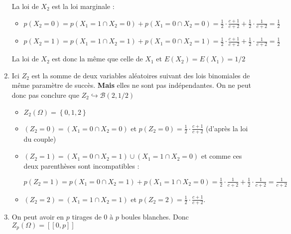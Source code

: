 \documentclass[a4paper, 11pt,reqno]{article}
\begin{document}
\begin{correction}
\begin{enumerate}
La loi de $X_{2}$ est la loi marginale :

\begin{itemize}
\item $p\left( X_{2}=0\right) =p\left( X_{1}=1\cap X_{2}=0\right) +p\left(
X_{1}=0\cap X_{2}=0\right) =\displaystyle
\frac{1}{2}\cdot \frac{c+1}{c+2}+\frac{1}{2}\cdot \frac{1}{c+2}=\frac{1}{2}$

\item $p\left( X_{2}=1\right) =p\left( X_{1}=1\cap X_{2}=1\right) +p\left(
X_{1}=0\cap X_{2}=1\right) =\displaystyle
\frac{1}{2}\cdot \frac{c+1}{c+2}+\frac{1}{2}\cdot \frac{1}{c+2}=\frac{1}{2}$
\end{itemize}

La loi de $X_{2}$ est donc la m\^{e}me que celle de $X_{1}$ et $E\left(
X_{2}\right) =E\left( X_{1}\right) =1/2$

\item Ici $Z_{2}$ est la somme de deux variables al\'{e}atoires suivant des
lois binomiales de m\^{e}me param\`{e}tre de succ\`{e}s. \textbf{Mais }elles
ne sont pas ind\'{e}pendantes. On ne peut donc pas conclure que $%
Z_{2}\hookrightarrow \mathcal{B}\left( 2,1/2\right) $

\begin{itemize}
\item $Z_{2}\left( \Omega \right) =\left\{ 0,1,2\right\} $

\item $\left( Z_{2}=0\right) =\left( X_{1}=0\cap X_{2}=0\right) $ et $%
p\left( Z_{2}=0\right) =\displaystyle
\frac{1}{2}\cdot \frac{c+1}{c+2}$ (d'apr\`{e}s la loi du couple)

\item $\left( Z_{2}=1\right) =\left( X_{1}=0\cap X_{2}=1\right) \cup \left(
X_{1}=1\cap X_{2}=0\right) $ et comme ces deux parenth\`{e}ses sont
incompatibles :

$p\left( Z_{2}=1\right) =p\left( X_{1}=0\cap X_{2}=1\right) +p\left(
X_{1}=1\cap X_{2}=0\right) =\displaystyle
\frac{1}{2}\cdot \frac{1}{c+2}+\frac{1}{2}\cdot \frac{1}{c+2}=\frac{1}{c+2}$

\item $\left( Z_{2}=2\right) =\left( X_{1}=1\cap X_{2}=1\right) $ et $%
p\left( Z_{2}=2\right) =\displaystyle
\frac{1}{2}\cdot \frac{c+1}{c+2}$.
\end{itemize}

\item On peut avoir en $p$ tirages de 0 \`{a} $p$ boules blanches. Donc $%
Z_{p}\left( \Omega \right) =\left[ \left[ 0,p\right] \right] $


\end{enumerate}
\end{correction}
\end{document}
